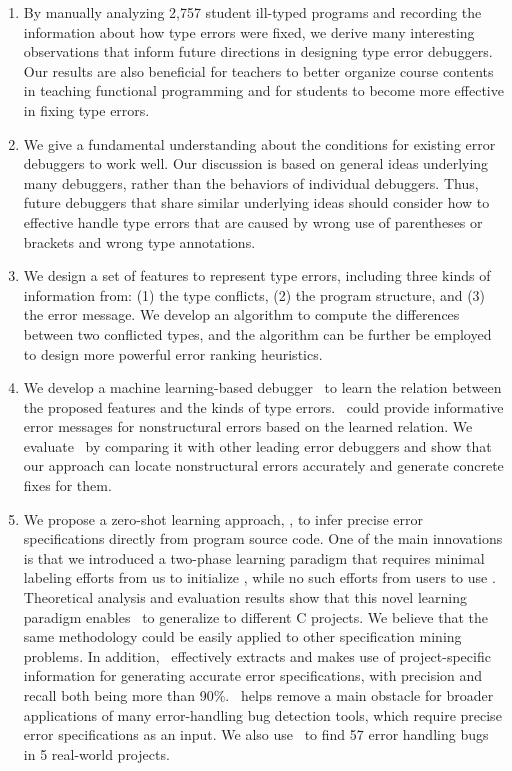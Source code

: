 \documentclass[12pt]{report}	%
\begin{document}
\begin{enumerate}

\item By manually analyzing 2,757 student ill-typed programs 
and recording the information about how type errors were fixed, 
we derive many interesting observations that inform future directions in designing type error debuggers.
Our results are also beneficial for teachers to better organize course contents in teaching functional programming
and for students to become more effective in fixing type errors.

\item We give a fundamental understanding about the conditions for existing error debuggers to work well.
Our discussion is based on general ideas underlying many debuggers, rather than the behaviors of individual debuggers.
Thus, future debuggers that share similar underlying ideas
should consider how to effective handle type errors that are caused by wrong use of parentheses or brackets and wrong type annotations.

\item We design a set of features to represent type errors,
including three kinds of information from:
(1) the type conflicts, (2) the program structure, and (3) the error message.
We develop an algorithm to compute the differences between two conflicted types,
and the algorithm can be further be employed to design more powerful error ranking heuristics.

\item We develop a machine learning-based debugger \newCompiler\ to learn the relation between the proposed features and the kinds of type errors.
\newCompiler\ could provide informative error messages for nonstructural errors based on the learned relation.
We evaluate \newCompiler\ by comparing it with other leading error debuggers 
and show that our approach can locate nonstructural errors accurately and generate concrete fixes for them.

\item We propose a zero-shot learning approach, \newTool,
to infer precise error specifications directly from program source code.
One of the main innovations is that we introduced a two-phase learning paradigm
that requires minimal labeling efforts from us to initialize \newTool,
while no such efforts from users to use \newTool.
%
Theoretical analysis and evaluation results show that 
this novel learning paradigm enables \newTool\ to generalize to different C projects.
We believe that the same methodology could be easily applied to other specification mining problems.
%
In addition, \newTool\ effectively
extracts and makes use of project-specific information for generating accurate
error specifications, with precision and recall both being more than 90\%. 
%
\newTool\ helps remove a 
main obstacle for broader applications of many error-handling bug
detection tools, which require precise error specifications as an input.
We also use \newTool\ to find 57 error handling bugs in 5 real-world projects.

\end{enumerate}
\end{document}
